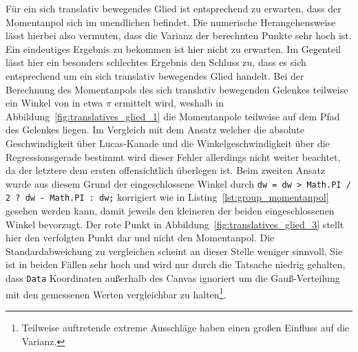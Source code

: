 Für ein sich translativ bewegendes Glied ist entsprechend zu erwarten, dass der Momentanpol sich im unendlichen befindet.
Die numerische Herangehensweise lässt hierbei also vermuten, dass die Varianz der berechnten Punkte sehr hoch ist.
Ein eindeutiges Ergebnis zu bekommen ist hier nicht zu erwarten.
Im Gegenteil lässt hier ein besonders schlechtes Ergebnis den Schluss zu, dass es sich entsprechend um ein sich translativ bewegendes Glied handelt.
Bei der Berechnung des Momentanpols des sich translativ bewegenden Gelenkes teilweise ein Winkel von in etwa $\pi$ ermittelt wird, weshalb in Abbildung~\ref{fig:translatives_glied_1} die Momentanpole teilweise auf dem Pfad des Gelenkes liegen.
Im Vergleich mit dem Ansatz welcher die absolute Geschwindigkeit über Lucas-Kanade und die Winkelgeschwindigkeit über die Regressionsgerade bestimmt wird dieser Fehler allerdings nicht weiter beachtet, da der letztere dem ersten offensichtlich überlegen ist.
Beim zweiten Ansatz wurde aus diesem Grund der eingeschlossene Winkel durch \lstinline{dw = dw > Math.PI / 2 ? dw - Math.PI : dw;} korrigiert wie in Listing~\ref{lst:group_momentanpol} gesehen werden kann, damit jeweils den kleineren der beiden eingeschlossenen Winkel bevorzugt.
Der rote Punkt in Abbildung~\ref{fig:translatives_glied_3} stellt hier den verfolgten Punkt dar und nicht den Momentanpol.
Die Standardabweichung zu vergleichen scheint an dieser Stelle weniger sinnvoll.
Sie ist in beiden Fällen sehr hoch und wird nur durch die Tatsache niedrig gehalten, dass \lstinline{Data} Koordinaten au{\ss}erhalb des Canvas ignoriert um die Gau{\ss}-Verteilung mit den gemessenen Werten vergleichbar zu halten\footnote{Teilweise auftretende extreme Ausschläge haben einen gro{\ss}en Einfluss auf die Varianz.}.

